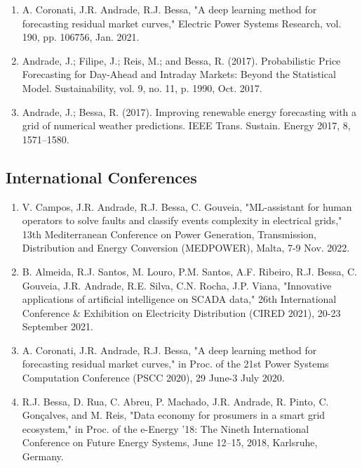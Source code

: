 \documentclass{mycv}
\begin{document}
{\begin{enumerate}
	\item A. Coronati, J.R. Andrade, R.J. Bessa, "A deep learning method for forecasting residual market curves," Electric Power Systems Research, vol. 190, pp. 106756, Jan. 2021.
	
	\item Andrade, J.; Filipe, J.; Reis, M.; and Bessa, R. (2017). Probabilistic Price Forecasting for Day-Ahead and Intraday Markets: Beyond the Statistical Model. Sustainability, vol. 9, no. 11, p. 1990, Oct. 2017.
	
	\item Andrade, J.; Bessa, R. (2017). Improving renewable energy forecasting with a grid of
	numerical weather predictions. IEEE Trans. Sustain. Energy 2017, 8, 1571–1580.
	
	
\end{enumerate}


\subsection{International Conferences}

\begin{enumerate}
	
	\item V. Campos, J.R. Andrade, R.J. Bessa, C. Gouveia, "ML-assistant for human operators to solve faults and classify events complexity in electrical grids," 13th Mediterranean Conference on Power Generation, Transmission, Distribution and Energy Conversion (MEDPOWER), Malta, 7-9 Nov. 2022.
	
	\item B. Almeida, R.J. Santos, M. Louro, P.M. Santos, A.F. Ribeiro, R.J. Bessa, C. Gouveia, J.R. Andrade, R.E. Silva, C.N. Rocha, J.P. Viana, "Innovative applications of artificial intelligence on SCADA data," 26th International Conference \& Exhibition on Electricity Distribution (CIRED 2021), 20-23 September 2021.

	\item A. Coronati, J.R. Andrade, R.J. Bessa, "A deep learning method for forecasting residual market curves," in Proc. of the 21st Power Systems Computation Conference (PSCC 2020), 29 June-3 July 2020.

	\item R.J. Bessa, D. Rua, C. Abreu, P. Machado, J.R. Andrade, R. Pinto, C. Gonçalves, and M. Reis, "Data economy for prosumers in a smart grid ecosystem," in Proc. of the e-Energy ’18: The Nineth International Conference on Future Energy Systems, June 12–15, 2018, Karlsruhe, Germany.
	

\end{enumerate}}
\end{document}
